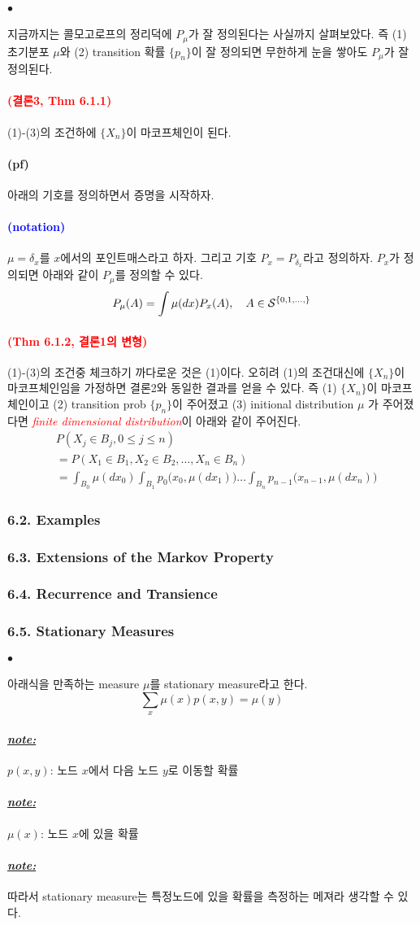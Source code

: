 \documentclass[12pt,oneside,english]{book}
\def\ck{\paragraph{\Large$\bullet$}\Large}
\def\pf{\paragraph{\Large(pf)}\Large}
\def\note{\paragraph{\Large\textit{\underline{note:}}}\Large}
\newcommand{\parablue}[1]{\paragraph{\Large\textcolor{blue}{(#1)}}\Large}
\newcommand{\parared}[1]{\paragraph{\Large\textcolor{red}{(#1)}}\Large}
\begin{document}
\ck 지금까지는 콜모고로프의 정리덕에 $P_{\mu}$가 잘 정의된다는 사실까지 살펴보았다. 즉 (1) 초기분포 $\mu$와 (2) transition 확률 $\{p_n\}$이 잘 정의되면 무한하게 눈을 쌓아도 $P_{\mu}$가 잘 정의된다. 

\parared{결론3, Thm 6.1.1} (1)-(3)의 조건하에 $\{X_n\}$이 마코프체인이 된다. 
\pf 아래의 기호를 정의하면서 증명을 시작하자. 
\parablue{notation}
$\mu=\delta_x$를 $x$에서의 포인트매스라고 하자. 그리고 기호 $P_x=P_{\delta_x}$라고 정의하자. $P_x$가 정의되면 아래와 같이 $P_{\mu}$를 정의할 수 있다. 
\[
P_{\mu}(A)=\int \mu(dx)P_x(A), \quad A \in {\cal S}^{\{0,1,\dots,\}}
\]

\parared{Thm 6.1.2, 결론1의 변형} (1)-(3)의 조건중 체크하기 까다로운 것은 (1)이다. 오히려 (1)의 조건대신에 $\{X_n\}$이 마코프체인임을 가정하면 결론2와 동일한 결과를 얻을 수 있다. 즉 (1) $\{X_n\}$이 마코프체인이고 (2) transition prob $\{p_n\}$이 주어졌고 (3) initional distribution $\mu$ 가 주어졌다면 \textcolor{red}{\emph{finite dimensional distribution}}이 아래와 같이 주어진다. 
\begin{align*}
& P(X_j \in B_j, 0\leq j \leq n) \\ 
& = P(X_1\in B_1, X_2\in B_2, \dots, X_n \in B_n)\\
& = \int_{B_0}\mu(dx_0)\int_{B_1}p_0\big(x_0,\mu(dx_1)\big)\dots\int_{B_n}p_{n-1}\big(x_{n-1},\mu(dx_n)\big)
\end{align*}

\subsubsection{6.2. Examples}

\subsubsection{6.3. Extensions of the Markov Property}

\subsubsection{6.4. Recurrence and Transience}

\subsubsection{6.5. Stationary Measures}
\ck 아래식을 만족하는 measure $\mu$를 stationary measure라고 한다. 
\[
\sum_x\mu(x)p(x,y)=\mu(y)
\]
\note $p(x,y)$: 노드 $x$에서 다음 노드 $y$로 이동할 확률
\note $\mu(x)$: 노드 $x$에 있을 확률
\note 따라서 stationary measure는 특정노드에 있을 확률을 측정하는 메져라 생각할 수 있다. 
\end{document}
